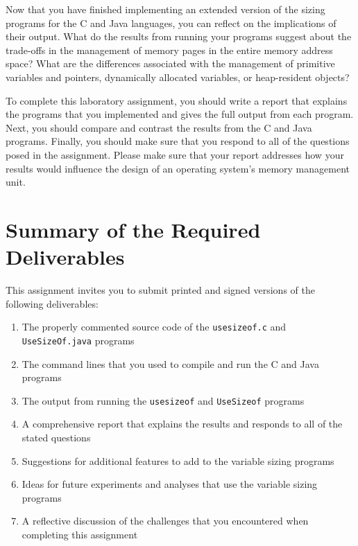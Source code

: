   Now that you have finished implementing an extended version of the sizing programs for the C and Java languages, you
  can reflect on the implications of their output. What do the results from running your programs suggest about the
  trade-offs in the management of memory pages in the entire memory address space? What are the differences associated
  with the management of primitive variables and pointers, dynamically allocated variables, or heap-resident objects? 
  
  To complete this laboratory assignment, you should write a report that explains the programs that you implemented and
  gives the full output from each program.  Next, you should compare and contrast the results from the C and Java
  programs.  Finally, you should make sure that you respond to all of the questions posed in the assignment. Please make
  sure that your report addresses how your results would influence the design of an operating system's memory
  management unit. 

\section*{Summary of the Required Deliverables}

This assignment invites you to submit printed and signed versions of the following deliverables: 

\begin{enumerate}

  \item The properly commented source code of the {\tt usesizeof.c} and {\tt UseSizeOf.java} programs

  \item The command lines that you used to compile and run the C and Java programs

  \item The output from running the {\tt usesizeof} and {\tt UseSizeof} programs

  \item A comprehensive report that explains the results and responds to all of the stated questions 

  \item Suggestions for additional features to add to the variable sizing programs

  \item Ideas for future experiments and analyses that use the variable sizing programs

  \item A reflective discussion of the challenges that you encountered when completing this assignment

\end{enumerate}

